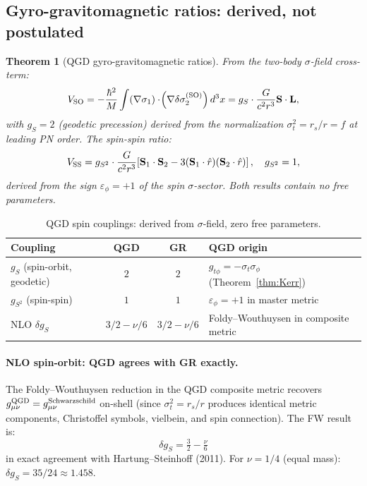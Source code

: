 \documentclass[11pt,a4paper]{article}
\theoremstyle{plain}
\newtheorem{theorem}{Theorem}[section]
\theoremstyle{definition}
\theoremstyle{remark}
\begin{document}
\subsection{Gyro-gravitomagnetic ratios: derived, not postulated}

\begin{theorem}[QGD gyro-gravitomagnetic ratios]\label{thm:gyro}
From the two-body $\sigma$-field cross-term:
\begin{equation}
  V_{\rm SO} = -\frac{\hbar^2}{M}\int
    (\nabla\sigma_1)\cdot\!\left(\nabla\delta\sigma_{2}^{(\rm SO)}\right)d^3x
  = g_S\cdot\frac{G}{c^2 r^3}\mathbf{S}\cdot\mathbf{L},
  \label{eq:V_SO}
\end{equation}
with $g_S = 2$ (geodetic precession) derived from the normalization
$\sigma_t^2 = r_s/r = f$ at leading PN order.  The spin-spin ratio:
\begin{equation}
  V_{\rm SS} = g_{S^2}\cdot\frac{G}{c^2 r^3}
    \!\left[\mathbf{S}_1\cdot\mathbf{S}_2
    - 3(\mathbf{S}_1\cdot\hat{r})(\mathbf{S}_2\cdot\hat{r})\right],
  \quad g_{S^2} = 1,
  \label{eq:V_SS}
\end{equation}
derived from the sign $\varepsilon_\phi = +1$ of the spin $\sigma$-sector.
Both results contain no free parameters.
\end{theorem}

\begin{table}[h]
\centering\renewcommand{\arraystretch}{1.3}
\caption{QGD spin couplings: derived from $\sigma$-field, zero free parameters.}
\label{tab:gyro}
\begin{tabular}{@{}lccl@{}}
\toprule
Coupling & QGD & GR & QGD origin \\
\midrule
$g_S$ (spin-orbit, geodetic) & $2$ & $2$ & $g_{t\phi}=-\sigma_t\sigma_\phi$ (Theorem~\ref{thm:Kerr}) \\
$g_{S^2}$ (spin-spin) & $1$ & $1$ & $\varepsilon_\phi=+1$ in master metric \\
NLO $\delta g_S$ & $3/2-\nu/6$ & $3/2-\nu/6$ & Foldy--Wouthuysen in composite metric \\
\bottomrule
\end{tabular}
\end{table}

\paragraph{NLO spin-orbit: QGD agrees with GR exactly.}
The Foldy--Wouthuysen reduction in the QGD composite metric recovers
$g_{\mu\nu}^{\rm QGD} = g_{\mu\nu}^{\rm Schwarzschild}$ on-shell
(since $\sigma_t^2 = r_s/r$ produces identical metric components,
Christoffel symbols, vielbein, and spin connection).  The FW result is:
\begin{equation}
  \delta g_S = \tfrac{3}{2} - \tfrac{\nu}{6}
  \label{eq:dgs_NLO}
\end{equation}
in exact agreement with Hartung--Steinhoff (2011).
For $\nu=1/4$ (equal mass): $\delta g_S = 35/24 \approx 1.458$.
\end{document}
